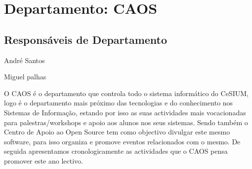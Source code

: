 \section{Departamento: CAOS}

\subsection{Responsáveis de Departamento}
\begin{itemizedash}
	\item André Santos
	\item Miguel palhas
\end{itemizedash}


\indent O CAOS é o departamento que controla todo o sistema informático do CeSIUM, logo é o departamento mais próximo das tecnologias e do conhecimento nos Sistemas de Informação, estando por isso as suas actividades mais vocacionadas para palestras/workshops e apoio aos alunos nos seus sistemas. Sendo também o Centro de Apoio ao Open Source tem como objectivo divulgar este mesmo software, para isso organiza e promove eventos relacionados com o mesmo. De seguida apresentamos cronologicamente as actividades que o CAOS pensa promover este ano lectivo.
